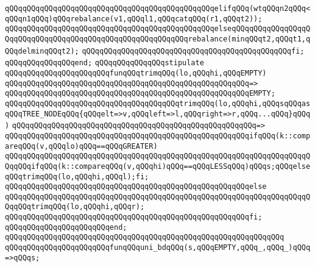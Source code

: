 \verb|qQQqqQQqqQQqqQQqqQQqqQQqqQQqqQQqqQQqqQQqqQQqqQQqelifqQQq(wtqQQqn2qQQq<qQQqn1qQQq)qQQqrebalance(v1,qQQql1,qQQqcatqQQq(r1,qQQqt2));|\newline
\verb|qQQqqQQqqQQqqQQqqQQqqQQqqQQqqQQqqQQqqQQqqQQqqQQqelseqQQqqQQqqQQqqQQqqQQqqQQqqQQqqQQqqQQqqQQqqQQqqQQqqQQqqQQqqQQqrebalance(minqQQqt2,qQQqt1,qQQqdelminqQQqt2);|\newline
\verb|qQQqqQQqqQQqqQQqqQQqqQQqqQQqqQQqqQQqqQQqqQQqqQQqfi;|\newline
\verb|qQQqqQQqqQQqqQQqend;|\newline
\newline
\newline
\verb|qQQqqQQqqQQqqQQqstipulate|\newline
\verb|qQQqqQQqqQQqqQQqqQQqqQQqfunqQQqtrimqQQq(lo,qQQqhi,qQQqEMPTY)|\newline
\verb|qQQqqQQqqQQqqQQqqQQqqQQqqQQqqQQqqQQqqQQqqQQqqQQqqQQqqQQq=>|\newline
\verb|qQQqqQQqqQQqqQQqqQQqqQQqqQQqqQQqqQQqqQQqqQQqqQQqqQQqqQQqEMPTY;|\newline
\newline
\verb|qQQqqQQqqQQqqQQqqQQqqQQqqQQqqQQqqQQqqQQqtrimqQQq(lo,qQQqhi,qQQqsqQQqasqQQqTREE_NODEqQQq{qQQqelt=>v,qQQqleft=>l,qQQqright=>r,qQQq...qQQq}qQQq)|\newline
\verb|qQQqqQQqqQQqqQQqqQQqqQQqqQQqqQQqqQQqqQQqqQQqqQQqqQQqqQQq=>|\newline
\verb|qQQqqQQqqQQqqQQqqQQqqQQqqQQqqQQqqQQqqQQqqQQqqQQqqQQqqQQqifqQQq(k::compareqQQq(v,qQQqlo)qQQq==qQQqGREATER)|\newline
\verb|qQQqqQQqqQQqqQQqqQQqqQQqqQQqqQQqqQQqqQQqqQQqqQQqqQQqqQQqqQQqqQQqqQQqqQQqqQQqifqQQq(k::compareqQQq(v,qQQqhi)qQQq==qQQqLESSqQQq)qQQqs;qQQqelseqQQqtrimqQQq(lo,qQQqhi,qQQql);fi;|\newline
\verb|qQQqqQQqqQQqqQQqqQQqqQQqqQQqqQQqqQQqqQQqqQQqqQQqqQQqqQQqelse|\newline
\verb|qQQqqQQqqQQqqQQqqQQqqQQqqQQqqQQqqQQqqQQqqQQqqQQqqQQqqQQqqQQqqQQqqQQqqQQqqQQqtrimqQQq(lo,qQQqhi,qQQqr);|\newline
\verb|qQQqqQQqqQQqqQQqqQQqqQQqqQQqqQQqqQQqqQQqqQQqqQQqqQQqqQQqfi;|\newline
\verb|qQQqqQQqqQQqqQQqqQQqqQQqend;|\newline
\verb|qQQqqQQqqQQqqQQqqQQqqQQqqQQqqQQqqQQqqQQqqQQqqQQqqQQqqQQqqQQqqQQq|\newline
\verb|qQQqqQQqqQQqqQQqqQQqqQQqfunqQQquni_bdqQQq(s,qQQqEMPTY,qQQq_,qQQq_)qQQq=>qQQqs;|\newline
\newline
